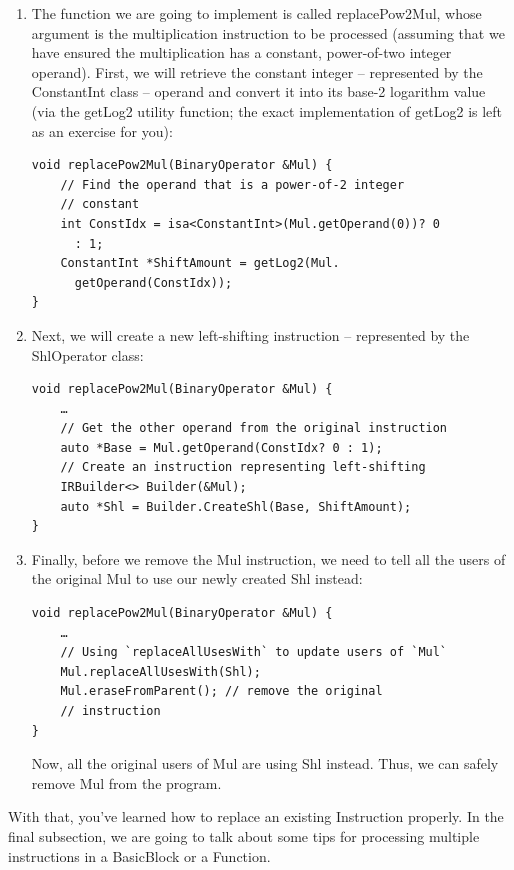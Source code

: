\begin{enumerate}
\item The function we are going to implement is called replacePow2Mul, whose argument is the multiplication instruction to be processed (assuming that we have ensured the multiplication has a constant, power-of-two integer operand). First, we will retrieve the constant integer – represented by the ConstantInt class – operand and convert it into its base-2 logarithm value (via the getLog2 utility function; the exact implementation of getLog2 is left as an exercise for you):

\begin{lstlisting}[style=styleCXX]
void replacePow2Mul(BinaryOperator &Mul) {
	// Find the operand that is a power-of-2 integer
	// constant
	int ConstIdx = isa<ConstantInt>(Mul.getOperand(0))? 0
	  : 1;
	ConstantInt *ShiftAmount = getLog2(Mul.
	  getOperand(ConstIdx));
}
\end{lstlisting}

\item Next, we will create a new left-shifting instruction – represented by the ShlOperator class:

\begin{lstlisting}[style=styleCXX]
void replacePow2Mul(BinaryOperator &Mul) {
	…
	// Get the other operand from the original instruction
	auto *Base = Mul.getOperand(ConstIdx? 0 : 1);
	// Create an instruction representing left-shifting
	IRBuilder<> Builder(&Mul);
	auto *Shl = Builder.CreateShl(Base, ShiftAmount);
}
\end{lstlisting}

\item Finally, before we remove the Mul instruction, we need to tell all the users of the original Mul to use our newly created Shl instead:

\begin{lstlisting}[style=styleCXX]
void replacePow2Mul(BinaryOperator &Mul) {
	…
	// Using `replaceAllUsesWith` to update users of `Mul`
	Mul.replaceAllUsesWith(Shl);
	Mul.eraseFromParent(); // remove the original
	// instruction
}
\end{lstlisting}

Now, all the original users of Mul are using Shl instead. Thus, we can safely remove Mul from the program.

\end{enumerate}

With that, you've learned how to replace an existing Instruction properly. In the final subsection, we are going to talk about some tips for processing multiple instructions in a BasicBlock or a Function.

